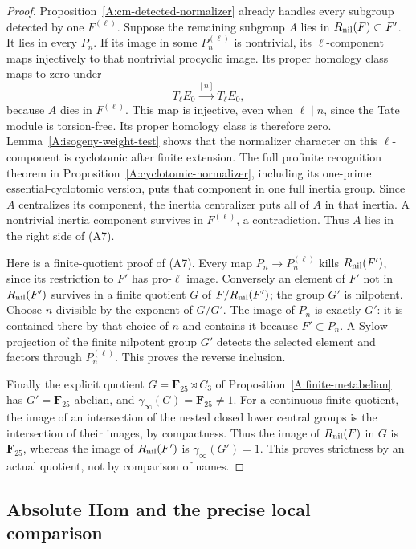 \documentclass[11pt,oneside]{article}
\begin{document}
\begin{proof}
Proposition~\ref{A:cm-detected-normalizer} already
handles every subgroup detected by one $F^{(\ell)}$.
Suppose the remaining subgroup $A$ lies in
$R_{\rm nil}(F)\subset F'$.  It lies in every $P_n$.
If its image in some $P_n^{(\ell)}$ is nontrivial,
its $\ell$-component maps injectively to that
nontrivial procyclic image.  Its proper homology class
maps to zero under
\[
 T_\ell E_0\xrightarrow{[n]}T_\ell E_0,
\]
because $A$ dies in $F^{(\ell)}$.  This map is
injective, even when $\ell\mid n$, since the Tate
module is torsion-free.  Its proper homology class
is therefore zero.  Lemma~\ref{A:isogeny-weight-test}
shows that the normalizer character on this
$\ell$-component is cyclotomic after finite extension.
The full profinite recognition theorem in
Proposition~\ref{A:cyclotomic-normalizer}, including
its one-prime essential-cyclotomic version, puts that
component in one full inertia group.  Since $A$
centralizes its component, the inertia centralizer
puts all of $A$ in that inertia.  A nontrivial
inertia component survives in $F^{(\ell)}$, a
contradiction.  Thus $A$ lies in the right side of
(A7).

Here is a finite-quotient proof of (A7).  Every
map $P_n\to P_n^{(\ell)}$ kills
$R_{\rm nil}(F')$, since its restriction to $F'$
has pro-$\ell$ image.  Conversely an element of
$F'$ not in $R_{\rm nil}(F')$ survives in a finite
quotient $G$ of $F/R_{\rm nil}(F')$; the group
$G'$ is nilpotent.  Choose $n$ divisible by the
exponent of $G/G'$.  The image of $P_n$ is exactly
$G'$: it is contained there by that choice of $n$
and contains it because $F'\subset P_n$.
A Sylow projection of the finite nilpotent group
$G'$ detects the selected element and factors
through $P_n^{(\ell)}$.  This proves the reverse
inclusion.

Finally the explicit quotient
$G=\mathbf F_{25}\rtimes C_3$ of
Proposition~\ref{A:finite-metabelian} has
$G'=\mathbf F_{25}$ abelian, and
$\gamma_\infty(G)=\mathbf F_{25}\ne1$.
For a continuous finite quotient, the image of an
intersection of the nested closed lower central
groups is the intersection of their images, by
compactness.  Thus the image of
$R_{\rm nil}(F)$ in $G$ is $\mathbf F_{25}$,
whereas the image of $R_{\rm nil}(F')$ is
$\gamma_\infty(G')=1$.  This proves strictness by
an actual quotient, not by comparison of names.
\end{proof}

\subsection{Absolute Hom and the precise local comparison}
\end{document}
